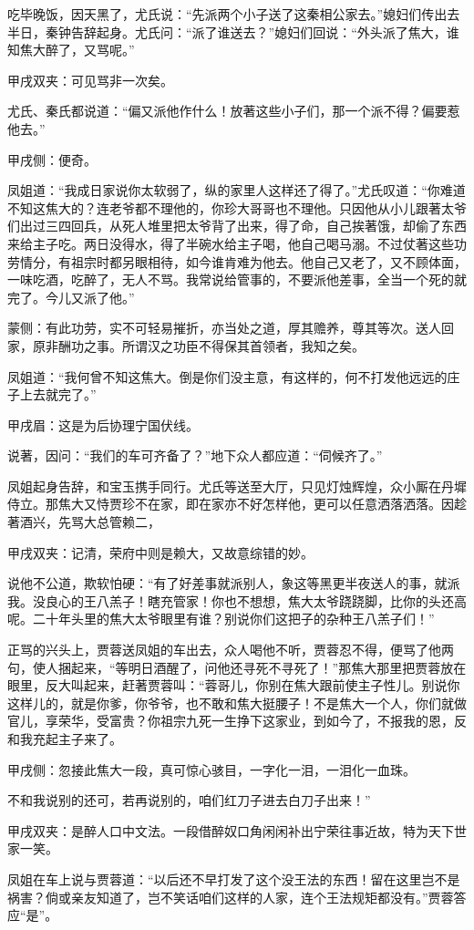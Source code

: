 \begin{parag}
    吃毕晚饭，因天黑了，尤氏说：“先派两个小子送了这秦相公家去。”媳妇们传出去半日，秦钟告辞起身。尤氏问：“派了谁送去？”媳妇们回说：“外头派了焦大，谁知焦大醉了，又骂呢。”\begin{note}甲戌双夹：可见骂非一次矣。\end{note}尤氏、秦氏都说道：“偏又派他作什么！放著这些小子们，那一个派不得？偏要惹他去。”\begin{note}甲戌侧：便奇。\end{note}凤姐道：“我成日家说你太软弱了，纵的家里人这样还了得了。”尤氏叹道：“你难道不知这焦大的？连老爷都不理他的，你珍大哥哥也不理他。只因他从小儿跟著太爷们出过三四回兵，从死人堆里把太爷背了出来，得了命，自己挨著饿，却偷了东西来给主子吃。两日没得水，得了半碗水给主子喝，他自己喝马溺。不过仗著这些功劳情分，有祖宗时都另眼相待，如今谁肯难为他去。他自己又老了，又不顾体面，一味吃酒，吃醉了，无人不骂。我常说给管事的，不要派他差事，全当一个死的就完了。今儿又派了他。”\begin{note}蒙侧：有此功劳，实不可轻易摧折，亦当处之道，厚其赡养，尊其等次。送人回家，原非酬功之事。所谓汉之功臣不得保其首领者，我知之矣。\end{note}凤姐道：“我何曾不知这焦大。倒是你们没主意，有这样的，何不打发他远远的庄子上去就完了。”\begin{note}甲戌眉：这是为后协理宁国伏线。\end{note}说著，因问：“我们的车可齐备了？”地下众人都应道：“伺候齐了。”
\end{parag}


\begin{parag}
    凤姐起身告辞，和宝玉携手同行。尤氏等送至大厅，只见灯烛辉煌，众小厮在丹墀侍立。那焦大又恃贾珍不在家，即在家亦不好怎样他，更可以任意洒落洒落。因趁著酒兴，先骂大总管赖二，\begin{note}甲戌双夹：记清，荣府中则是赖大，又故意综错的妙。\end{note}说他不公道，欺软怕硬：“有了好差事就派别人，象这等黑更半夜送人的事，就派我。没良心的王八羔子！瞎充管家！你也不想想，焦大太爷跷跷脚，比你的头还高呢。二十年头里的焦大太爷眼里有谁？别说你们这把子的杂种王八羔子们！”
\end{parag}


\begin{parag}
    正骂的兴头上，贾蓉送凤姐的车出去，众人喝他不听，贾蓉忍不得，便骂了他两句，使人捆起来，“等明日酒醒了，问他还寻死不寻死了！”那焦大那里把贾蓉放在眼里，反大叫起来，赶著贾蓉叫：“蓉哥儿，你别在焦大跟前使主子性儿。别说你这样儿的，就是你爹，你爷爷，也不敢和焦大挺腰子！不是焦大一个人，你们就做官儿，享荣华，受富贵？你祖宗九死一生挣下这家业，到如今了，不报我的恩，反和我充起主子来了。\begin{note}甲戌侧：忽接此焦大一段，真可惊心骇目，一字化一泪，一泪化一血珠。\end{note}不和我说别的还可，若再说别的，咱们红刀子进去白刀子出来！”\begin{note}甲戌双夹：是醉人口中文法。一段借醉奴口角闲闲补出宁荣往事近故，特为天下世家一笑。\end{note}凤姐在车上说与贾蓉道：“以后还不早打发了这个没王法的东西！留在这里岂不是祸害？倘或亲友知道了，岂不笑话咱们这样的人家，连个王法规矩都没有。”贾蓉答应“是”。
\end{parag}


